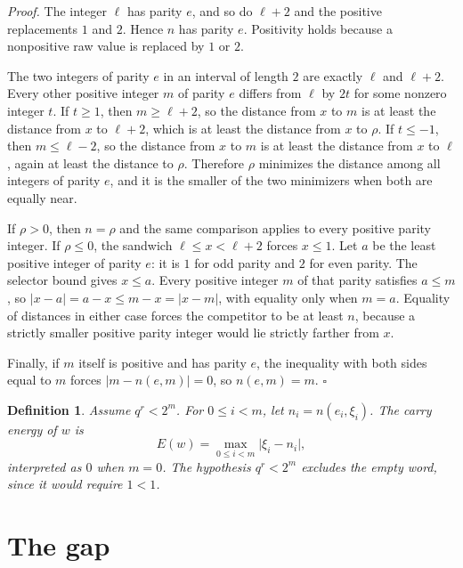 \documentclass[11pt,letterpaper]{article}
\newtheorem{definition}[theorem]{Definition}
\newenvironment{proof}{\noindent\textit{Proof.}}{\hfill\(\square\)}
\begin{document}
\begin{proof}
The integer \(\ell\) has parity \(e\), and so do \(\ell+2\) and the positive replacements \(1\) and \(2\). Hence \(n\) has parity \(e\). Positivity holds because a nonpositive raw value is replaced by \(1\) or \(2\).

The two integers of parity \(e\) in an interval of length \(2\) are exactly \(\ell\) and \(\ell+2\). Every other positive integer \(m\) of parity \(e\) differs from \(\ell\) by \(2t\) for some nonzero integer \(t\). If \(t\ge 1\), then \(m\ge \ell+2\), so the distance from \(x\) to \(m\) is at least the distance from \(x\) to \(\ell+2\), which is at least the distance from \(x\) to \(\rho\). If \(t\le -1\), then \(m\le \ell-2\), so the distance from \(x\) to \(m\) is at least the distance from \(x\) to \(\ell\), again at least the distance to \(\rho\). Therefore \(\rho\) minimizes the distance among all integers of parity \(e\), and it is the smaller of the two minimizers when both are equally near.

If \(\rho>0\), then \(n=\rho\) and the same comparison applies to every positive parity integer. If \(\rho\le 0\), the sandwich \(\ell\le x<\ell+2\) forces \(x\le 1\). Let \(a\) be the least positive integer of parity \(e\): it is \(1\) for odd parity and \(2\) for even parity. The selector bound gives \(x\le a\). Every positive integer \(m\) of that parity satisfies \(a\le m\), so \(\lvert x-a\rvert=a-x\le m-x=\lvert x-m\rvert\), with equality only when \(m=a\). Equality of distances in either case forces the competitor to be at least \(n\), because a strictly smaller positive parity integer would lie strictly farther from \(x\).

Finally, if \(m\) itself is positive and has parity \(e\), the inequality with both sides equal to \(m\) forces \(\lvert m-n(e,m)\rvert=0\), so \(n(e,m)=m\).
\end{proof}

\begin{definition}
Assume \(q^r<2^m\). For \(0\le i<m\), let \(n_i=n(e_i,\xi_i)\). The carry energy of \(w\) is
\[
E(w)=\max_{0\le i<m}\lvert\xi_i-n_i\rvert,
\]
interpreted as \(0\) when \(m=0\). The hypothesis \(q^r<2^m\) excludes the empty word, since it would require \(1<1\).
\end{definition}

\section{The gap}
\end{document}

